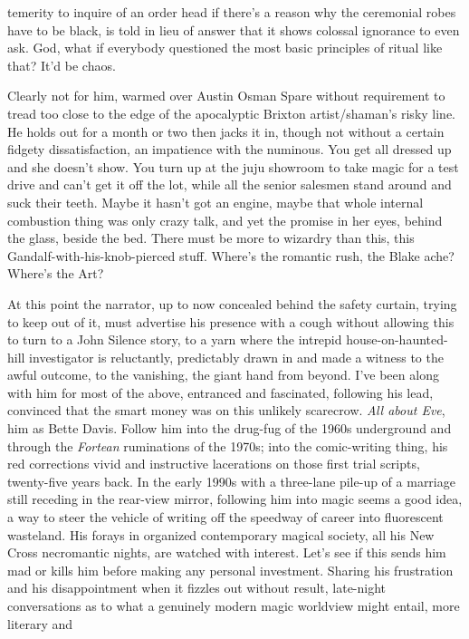 \documentclass[
]{article}
\begin{document}
temerity to inquire of an order head if there's a reason why the
ceremonial robes have to be black, is told in lieu of answer that it
shows colossal ignorance to even ask. God, what if everybody questioned
the most basic principles of ritual like that? It'd be chaos. \par
Clearly not for him, warmed over Austin Osman Spare without
requirement to tread too close to the edge of the apocalyptic Brixton
artist/shaman's risky line. He holds out for a month or two then jacks
it in, though not without a certain fidgety dissatisfaction, an
impatience with the numinous. You get all dressed up and she doesn't
show. You turn up at the juju showroom to take magic for a test drive
and can't get it off the lot, while all the senior salesmen stand around
and suck their teeth. Maybe it hasn't got an engine, maybe that whole
internal combustion thing was only crazy talk, and yet the promise in
her eyes, behind the glass, beside the bed. There must be more to
wizardry than this, this Gandalf-with-his-knob-pierced stuff. Where's
the romantic rush, the Blake ache? Where's the Art? \par
At this point the narrator, up to now concealed behind the safety
curtain, trying to keep out of it, must advertise his presence with a
cough without allowing this to turn to a John Silence story, to a yarn
where the intrepid house-on-haunted-hill investigator is reluctantly,
predictably drawn in and made a witness to the awful outcome, to the
vanishing, the giant hand from beyond. I've been along with him for most
of the above, entranced and fascinated, following his lead, convinced
that the smart money was on this unlikely scarecrow. \emph{All about
Eve}, him as Bette Davis. Follow him into the drug-fug of the 1960s
underground and through the \emph{Fortean} ruminations of the 1970s;
into the comic-writing thing, his red corrections vivid and instructive
lacerations on those first trial scripts, twenty-five years back. In the
early 1990s with a three-lane pile-up of a marriage still receding in
the rear-view mirror, following him into magic seems a good idea, a way
to steer the vehicle of writing off the speedway of career into
fluorescent wasteland. His forays in organized contemporary magical
society, all his New Cross necromantic nights, are watched with
interest. Let's see if this sends him mad or kills him before making any
personal investment. Sharing his frustration and his disappointment when
it fizzles out without result, late-night conversations as to what a
genuinely modern magic worldview might entail, more literary and
\end{document}
